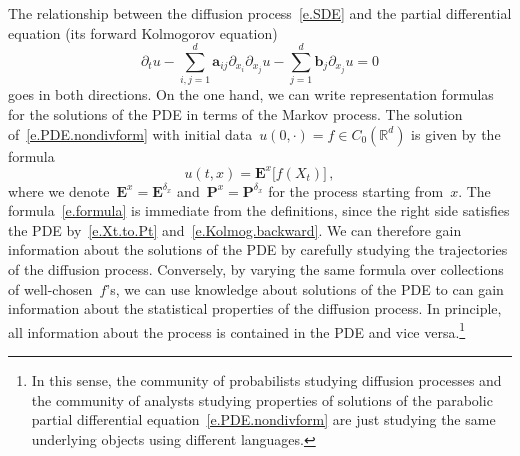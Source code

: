 \documentclass[11pt]{article} %
\numberwithin{equation}{section}
\theoremstyle{definition}
\newcommand*{\Rd}{\ensuremath{\mathbb{R}^d}}
\renewcommand{\b}{\ensuremath{\mathbf{b}}}
\renewcommand{\a}{\mathbf{a}}
\begin{document}
The relationship between the diffusion process~\eqref{e.SDE} and the partial differential equation (its forward Kolmogorov equation)
\begin{equation}
\label{e.PDE.nondivform}
\partial_t u - \sum_{i,j=1}^d \a_{ij} \partial_{x_i} \partial_{x_j} u
-
\sum_{j=1}^d \b_j \partial_{x_j} u = 0 
\end{equation}
goes in both directions. On the one hand, we can write representation formulas for the solutions of the PDE in terms of the Markov process. The solution of~\eqref{e.PDE.nondivform} with initial data~$u(0,\cdot) = f \in C_0(\Rd)$ is given by the formula
\begin{equation}
\label{e.formula}
u(t,x) 
=
\mathbf{E}^x 
\bigl[
f( X_t) 
\bigr]
\,,
\end{equation}
where we denote~$\mathbf{E}^x=\mathbf{E}^{\delta_x}$ and~$\mathbf{P}^x=\mathbf{P}^{\delta_x}$ for the process starting from~$x$. 
The formula~\eqref{e.formula} is immediate from the definitions, since the right side satisfies the PDE by~\eqref{e.Xt.to.Pt} and~\eqref{e.Kolmog.backward}. 
We can therefore gain information about the solutions of the PDE by carefully studying the trajectories of the diffusion process. 
Conversely, by varying the same formula over collections of well-chosen~$f$'s, we can use knowledge about solutions of the PDE to can gain information about the statistical properties of the diffusion process. In principle, all information about the process is contained in the PDE and vice versa.\footnote{In this sense, the community of probabilists studying diffusion processes and the community of analysts studying properties of solutions of the parabolic partial differential equation~\eqref{e.PDE.nondivform} are just studying the same underlying objects using different languages.} 

\smallskip
\end{document}
